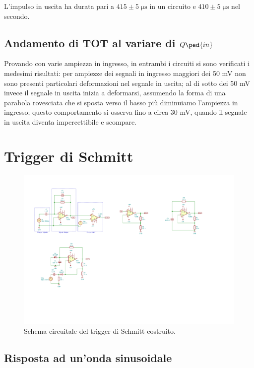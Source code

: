 \documentclass[10pt,a4paper]{article}
\begin{document}
L'impulso in uscita ha durata pari a $415 \pm 5 \; \si{\micro\s}$ in un circuito e $410 \pm 5 \; \si{\micro\s}$ nel secondo.

\subsection{Andamento di TOT al variare di $Q\ped{in}$}

Provando con varie ampiezza in ingresso, in entrambi i circuiti si sono verificati i medesimi risultati: per ampiezze dei segnali in ingresso maggiori dei 50 mV non sono presenti particolari deformazioni nel segnale in uscita; al di sotto dei 50 mV invece il segnale in uscita inizia a deformarsi, assumendo la forma di una parabola rovesciata che si sposta verso il basso più diminuiamo l'ampiezza in ingresso; questo comportamento si osserva fino a circa 30 mV, quando il segnale in uscita diventa impercettibile e scompare.

\section{Trigger di Schmitt}

\begin{figure}[htbp]
    \centering
	\includegraphics[scale=1.5]{trgSchmitt}
    \caption{Schema circuitale del trigger di Schmitt costruito.
    \label{fig: trgschmittschm}}
\end{figure}

\subsection{Risposta ad un'onda sinusoidale}
\end{document}
